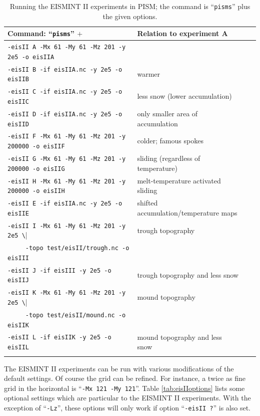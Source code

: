 \documentclass[11pt,final]{amsart}
\renewcommand{\t}[1]{\texttt{#1}}
\begin{document}
\begin{table}[h]
\caption{Running the EISMINT II experiments in PISM; the command is ``\t{pisms}'' plus the given options.}\label{tab:eisII}
\small
\begin{tabular}{@{}llll}\hline
\textbf{Command: ``\t{pisms}'' $+$} & \textbf{Relation to experiment A} \\ \hline
\verb|-eisII A -Mx 61 -My 61 -Mz 201 -y 2e5 -o eisIIA| & \\
\verb|-eisII B -if eisIIA.nc -y 2e5 -o eisIIB| & warmer \\
\verb|-eisII C -if eisIIA.nc -y 2e5 -o eisIIC| & less snow (lower accumulation)\\
\verb|-eisII D -if eisIIA.nc -y 2e5 -o eisIID| & only smaller area of accumulation \\
\verb|-eisII F -Mx 61 -My 61 -Mz 201 -y 200000 -o eisIIF| & colder; famous spokes \cite{BBL} \\
\verb|-eisII G -Mx 61 -My 61 -Mz 201 -y 200000 -o eisIIG| & sliding (regardless of temperature) \\
\verb|-eisII H -Mx 61 -My 61 -Mz 201 -y 200000 -o eisIIH| & melt-temperature activated sliding \\ \hline
\verb|-eisII E -if eisIIA.nc -y 2e5 -o eisIIE| & shifted accumulation/temperature maps \\
\verb|-eisII I -Mx 61 -My 61 -Mz 201 -y 2e5 \| & trough topography \\
\verb|     -topo test/eisII/trough.nc -o eisIII| &  \\
\verb|-eisII J -if eisIII -y 2e5 -o eisIIJ| & trough topography and less snow \\
\verb|-eisII K -Mx 61 -My 61 -Mz 201 -y 2e5 \| & mound topography \\
\verb|     -topo test/eisII/mound.nc -o eisIIK| &  \\
\verb|-eisII L -if eisIIK -y 2e5 -o eisIIL| & mound topography and less snow \\
\hline\normalsize
\end{tabular}\end{table}

The EISMINT II experiments can be run with various modifications of the default settings.  Of course the grid can be refined.  For instance, a twice as fine grid in the horizontal is ``\t{-Mx 121 -My 121}''.  Table \ref{tab:eisIIoptions} lists some optional settings which are particular to the EISMINT II experiments.  With the exception of ``\verb|-Lz|'', these options will only work if option ``\t{-eisII ?}'' is also set.
\end{document}
